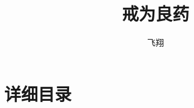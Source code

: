 \documentclass{ctexart}
\title{戒为良药}
\author{飞翔}
\date{}
\begin{document}
\maketitle
\begin{multicols}{2}
\end{multicols}\clearpage

% 

% 
% 
% 
% 
% 
% 
% 
% 
% 
% 
% 
% 
% 
% 
% 
% 
% 
% 
% 
% 
% 
% 
% 
% 
% 
% 
% 
% 
% 
% 
% 
% 
% 
% 
% 
% 
% 
% 
% 
% 
% 


\clearpage\appendix

\section{详细目录}
\end{document}
